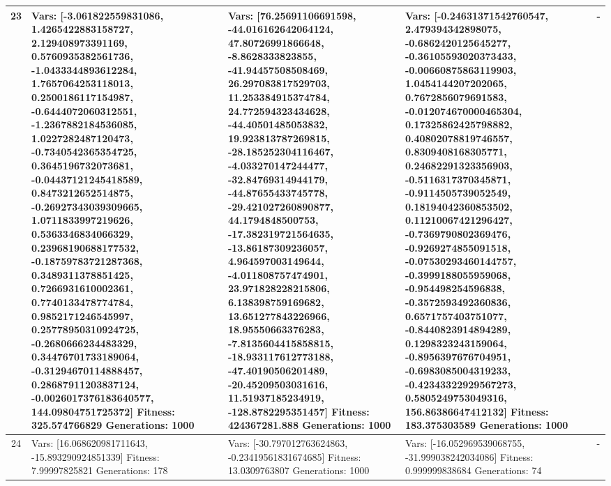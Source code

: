 \documentclass[landscape,11pt]{article}
\begin{document}
\begin{tabular}{|c|p{5.4cm}|p{5.4cm}|p{5.4cm}|p{5.4cm}|}
 23 & Vars: [-3.061822559831086, 1.4265422883158727, 2.129408973391169, 0.5760935382561736, -1.0433344893612284, 1.7657064253118013, 0.2500186117154987, -0.6444072060312551, -1.2367882184536085, 1.0227282487120473, -0.7340542365354725, 0.3645196732073681, -0.04437121245418589, 0.8473212652514875, -0.26927343039309665, 1.0711833997219626, 0.5363346834066329, 0.23968190688177532, -0.18759783721287368, 0.3489311378851425, 0.7266931610002361, 0.7740133478774784, 0.9852171246545997, 0.25778950310924725, -0.2680666234483329, 0.34476701733189064, -0.31294670114888457, 0.28687911203837124, -0.0026017376183640577, 144.09804751725372] Fitness: 325.574766829 Generations: 1000 & Vars: [76.25691106691598, -44.016162642064124, 47.80726991866648, -8.8628333823855, -41.94457508508469, 26.297083817529703, 11.253384915374784, 24.772594323434628, -44.40501485053832, 19.923813787269815, -28.185252304116467, -4.033270147244477, -32.84769314944179, -44.87655433745778, -29.421027260890877, 44.1794848500753, -17.382319721564635, -13.86187309236057, 4.964597003149644, -4.011808757474901, 23.971828228215806, 6.138398759169682, 13.651277843226966, 18.95550663376283, -7.8135604415858815, -18.933117612773188, -47.40190506201489, -20.45209503031616, 11.51937185234919, -128.8782295351457] Fitness: 424367281.888 Generations: 1000 & Vars: [-0.24631371542760547, 2.479394342898075, -0.6862420125645277, -0.36105593020373433, -0.00660875863119903, 1.0454144207202065, 0.7672856079691583, -0.012074670000465304, 0.17325862425798882, 0.40802078819746557, 0.8309408168305771, 0.24682291323356903, -0.5116317370345871, -0.9114505739052549, 0.18194042360853502, 0.11210067421296427, -0.7369790802369476, -0.9269274855091518, -0.07530293460144757, -0.3999188055959068, -0.954498254596838, -0.3572593492360836, 0.6571757403751077, -0.8440823914894289, 0.1298323243159064, -0.8956397676704951, -0.6983085004319233, -0.42343322929567273, 0.5805249753049316, 156.86386647412132] Fitness: 183.375303589 Generations: 1000 & - \\
 \hline 
 24 & Vars: [16.068620981711643, -15.893290924851339] Fitness: 7.99997825821 Generations: 178 & Vars: [-30.797012763624863, -0.23419561831674685] Fitness: 13.0309763807 Generations: 1000 & Vars: [-16.052969539068755, -31.999038242034086] Fitness: 0.999999838684 Generations: 74 & - \\
 \hline 
\end{tabular}
\end{document}
